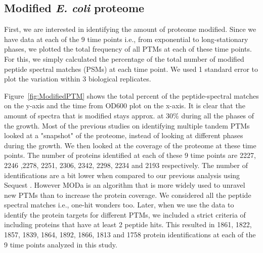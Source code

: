 \documentclass[12pt]{article}
\begin{document}


\subsection{Modified \emph{E. coli} proteome}
First, we are interested in identifying the amount of proteome modified. Since we have data at each of the 9 time points i.e., from exponential to long-stationary phases, we plotted the total frequency of all PTMs at each of these time points. For this, we simply calculated the percentage of the total number of modified peptide spectral matches (PSMs) at each time point. We used 1 standard error to plot the variation within 3 biological replicates.

Figure~\ref{fig:ModifiedPTM} shows the total percent of the peptide-spectral matches on the y-axis and the time from OD600 plot on the x-axis. It is clear that the amount of spectra that is modified stays approx. at 30\% during all the phases of the growth. Most of the previous studies on identifying multiple tandem PTMs looked at a "snapshot" of the proteome, instead of looking at different phases during the growth. We then looked at the coverage of the proteome at these time points. The number of proteins identified at each of these 9 time points are 2227, 2246
,2278, 2251, 2306, 2342, 2298, 2234 and 2193 respectively. The number of identifications are a bit lower when compared to our previous analysis using Sequest \cite{Houseretal2015}. However MODa is an algorithm that is more widely used to unravel new PTMs than to increase the protein coverage. We considered all the peptide spectral matches i.e., one-hit wonders too. Later, when we use the data to identify the protein targets for different PTMs, we included a strict criteria of including proteins that have at least 2 peptide hits. This resulted in 1861, 1822, 1857, 1839, 1864, 1892, 1866, 1813 and 1758 protein identifications at each of the 9 time points analyzed in this study.
\end{document}
